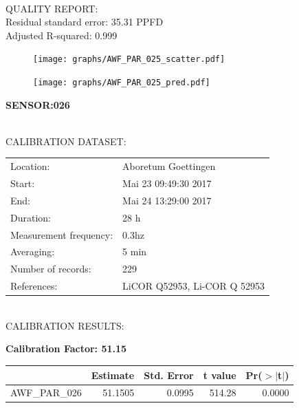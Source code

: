 \documentclass[oneside]{report}
\begin{document}
\hrulefill\\
QUALITY REPORT:\\
Residual standard error: 35.31 PPFD\\
Adjusted R-squared: 0.999



\begin{figure}[H]
  \centering
  \texttt{[image: graphs/AWF\_PAR\_025\_scatter.pdf]}
\end{figure}




\begin{figure}[H]
  \centering
  \texttt{[image: graphs/AWF\_PAR\_025\_pred.pdf]}
\end{figure}

\pagebreak


\begin{center}
\large{\textbf{SENSOR:026}}\\
\end{center}

\hrulefill\\
CALIBRATION DATASET:\\
\begin{table}[h!]
  \centering
  \label{tab:table1}
  \begin{tabular}{ll}
    Location: & Aboretum Goettingen\\ 
    
    
    Start:  & Mai 23 09:49:30 2017 \\
    End:   & Mai 24 13:29:00 2017\\ 
    Duration: & 28 h\\
    Measurement frequency: & 0.3hz\\
    Averaging:  &5 min\\
    Number of records: & 229 \\
    References: & LiCOR Q52953, Li-COR Q 52953 \\
  \end{tabular}
\end{table}

\hrulefill\\
CALIBRATION RESULTS:\\


\begin{center}
\textbf{\large{Calibration Factor: 51.15}}\\
\end{center}
\begin{table}[ht]
\centering
\begin{tabular}{rrrrr}
  \hline
 & Estimate & Std. Error & t value & Pr($>$$|$t$|$) \\ 
  \hline
AWF\_PAR\_026 & 51.1505 & 0.0995 & 514.28 & 0.0000 \\ 
   \hline
\end{tabular}
\end{table}
\end{document}
